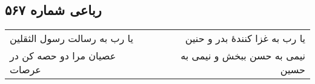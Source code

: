 \begin{center}
\section*{رباعی شماره ۵۶۷}
\label{sec:sh567}
\begin{longtable}{l p{0.5cm} r}
یا رب به رسالت رسول الثقلین
&&
یا رب به غزا کنندهٔ بدر و حنین
\\
عصیان مرا دو حصه کن در عرصات
&&
نیمی به حسن ببخش و نیمی به حسین
\\
\end{longtable}
\end{center}
